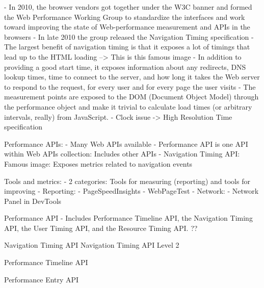 - In 2010, the browser vendors got together under the W3C banner and formed the Web Performance Working Group to standardize the interfaces and work toward improving the state of Web-performance measurement and APIs in the browsers
- In late 2010 the group released the Navigation Timing specification
- The largest benefit of navigation timing is that it exposes a lot of timings that lead up to the HTML loading --> This is this famous image
- In addition to providing a good start time, it exposes information about any redirects, DNS lookup times, time to connect to the server, and how long it takes the Web server to respond to the request, for every user and for every page the user visits
- The measurement points are exposed to the DOM (Document Object Model) through the performance object and make it trivial to calculate load times (or arbitrary intervals, really) from JavaScript.
- Clock issue -> High Resolution Time specification



Performance APIs:
- Many Web APIs available %
- Performance API is one API within Web APIs collection: Includes other APIs
- Navigation Timing API: Famous image: Exposes metrics related to navigation events

Tools and metrics:
- 2 categories: Tools for measuring (reporting) and tools for improving
- Reporting:
- PageSpeedInsights
- WebPageTest
- Network:
- Network Panel in DevTools





Performance API %
- Includes Performance Timeline API, the Navigation Timing API, the User Timing API, and the Resource Timing API.  ??



Navigation Timing API %
Navigation Timing API Level 2 %


Performance Timeline API %


Performance Entry API %


